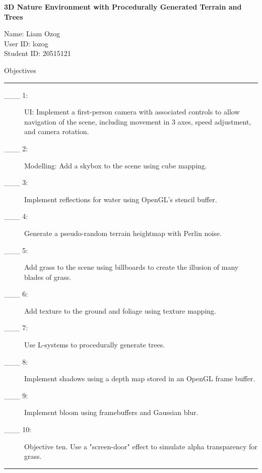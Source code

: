 \documentclass{article}
\newcommand\projecttitle{3D Nature Environment with Procedurally Generated Terrain and Trees}
\newcommand\myname{Liam Ozog}
\newcommand\myuserid{lozog}
\newcommand\mystudentid{20515121}
\begin{document}
\newpage

{\huge \bf 
	\projecttitle 
}

\medskip
Name: \myname \\ 
User ID: \myuserid \\ 
Student ID: \mystudentid 

\bigskip
{\Large Objectives}

\hrule
\begin{description}
        \item[\_\_\_ 1:]
          UI: Implement a first-person camera with associated controls to allow navigation of the scene, including movement in 3 axes, speed adjustment, and camera rotation.

        \item[\_\_\_ 2:]
		  Modelling: Add a skybox to the scene using cube mapping.

        \item[\_\_\_ 3:]
		  Implement reflections for water using OpenGL's stencil buffer.
			
        \item[\_\_\_ 4:]
		  Generate a pseudo-random terrain heightmap with Perlin noise.

        \item[\_\_\_ 5:]
		  Add grass to the scene using billboards to create the illusion of many blades of grass.

        \item[\_\_\_ 6:]
	      Add texture to the ground and foliage using texture mapping.

        \item[\_\_\_ 7:]
		  Use L-systems to procedurally generate trees.

        \item[\_\_\_ 8:]
		  Implement shadows using a depth map stored in an OpenGL frame buffer.

        \item[\_\_\_ 9:]
		  Implement bloom using framebuffers and Gaussian blur.

        \item[\_\_\_ 10:]
		  Objective ten. Use a "screen-door" effect to simulate alpha transparency for grass.

\end{description}

\hrule
\end{document}
